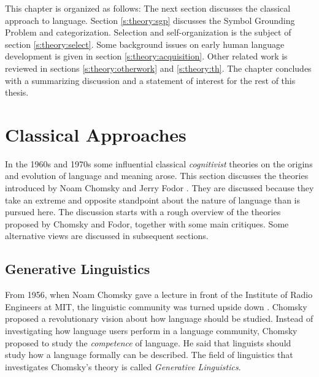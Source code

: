 This chapter is organized as follows: The next section discusses the classical approach to language. Section \ref{s:theory:sgp} discusses the Symbol Grounding Problem and categorization. Selection and self-organization is the subject of section \ref{s:theory:select}. Some background issues on early human language development is given in section \ref{s:theory:acquisition}. Other related work is reviewed in sections \ref{s:theory:otherwork} and \ref{s:theory:th}. The chapter concludes with a summarizing discussion and a statement of interest for the rest of this thesis.

\section{Classical Approaches}\label{s:theory:classic}

In the 1960s and 1970s some influential classical {\em cognitivist} theories on the origins and evolution of language and meaning arose. This section discusses the theories introduced by Noam Chomsky \citeyear{chomsky:1956,chomsky:1980} and Jerry Fodor \citeyear{fodor:1975}. They are discussed because they take an extreme and opposite standpoint about the nature of language than is pursued here. The discussion starts with a rough overview of the theories proposed by Chomsky and Fodor, together with some main critiques. Some alternative views are discussed in subsequent sections.

\subsection{Generative Linguistics}\label{s:theory:chomsky}

From 1956, when Noam Chomsky gave a lecture in front of the Institute of Radio Engineers at MIT, the linguistic community was turned upside down \cite{chomsky:1956}. Chomsky proposed a revolutionary vision about how language should be studied. Instead of investigating how language users perform in a language community, Chomsky proposed to study the {\em competence} of language. He said that linguists should study how a language formally can be described. The field of linguistics that investigates Chomsky's theory is called {\em Generative Linguistics}.


